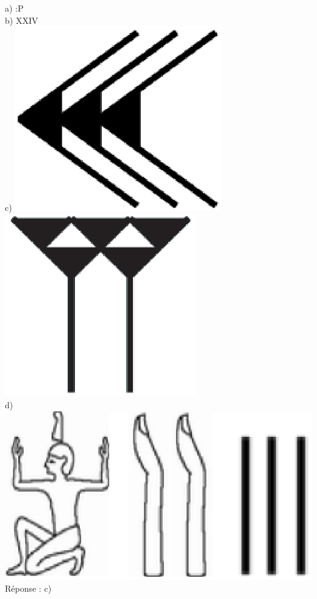 \documentclass[letterpaper, 12pt]{article}
\begin{document}
a) :\textsf{P}\\
b) XXIV\\
c) \includegraphics[scale=0.1]{30.eps} \includegraphics[scale=0.1]{5.eps}\\
d) \includegraphics[scale=0.15]{nombregyptien.eps}\\

R\'eponse : c)\\
\end{document}
